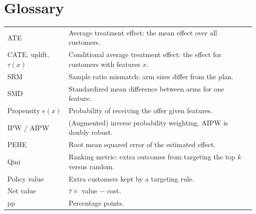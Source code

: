 \documentclass[11pt]{article}
\begin{document}
\appendix
\section{Glossary}
\begin{tabularx}{\textwidth}{@{}lL@{}}
\toprule
ATE & Average treatment effect: the mean effect over all customers. \\
CATE, uplift, $\tau(x)$ & Conditional average treatment effect: the effect for customers with features $x$. \\
SRM & Sample ratio mismatch: arm sizes differ from the plan. \\
SMD & Standardized mean difference between arms for one feature. \\
Propensity $e(x)$ & Probability of receiving the offer given features. \\
IPW / AIPW & (Augmented) inverse probability weighting. AIPW is doubly robust. \\
PEHE & Root mean squared error of the estimated effect. \\
Qini & Ranking metric: extra outcomes from targeting the top $k$ versus random. \\
Policy value & Extra customers kept by a targeting rule. \\
Net value & $\hat\tau \times$ value $-$ cost. \\
pp & Percentage points. \\
\bottomrule
\end{tabularx}
\end{document}
